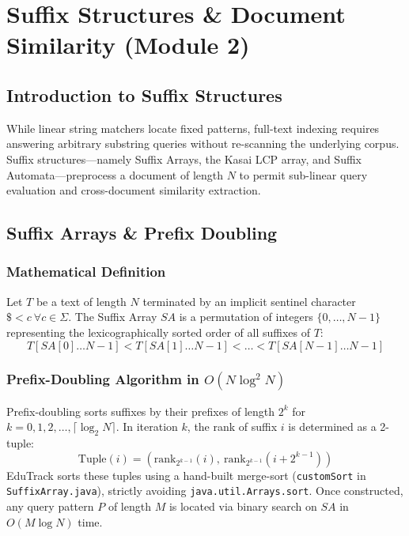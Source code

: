 \chapter{Suffix Structures \& Document Similarity (Module 2)}
\label{ch:suffix_structures}

\section{Introduction to Suffix Structures}
While linear string matchers locate fixed patterns, full-text indexing requires answering arbitrary substring queries without re-scanning the underlying corpus. Suffix structures—namely Suffix Arrays, the Kasai LCP array, and Suffix Automata—preprocess a document of length $N$ to permit sub-linear query evaluation and cross-document similarity extraction.

\section{Suffix Arrays \& Prefix Doubling}
\subsection{Mathematical Definition}
Let $T$ be a text of length $N$ terminated by an implicit sentinel character $\$ < c \ \forall c \in \Sigma$. The Suffix Array $SA$ is a permutation of integers $\{0, \dots, N - 1\}$ representing the lexicographically sorted order of all suffixes of $T$:
\begin{equation}
T[SA[0] \dots N-1] < T[SA[1] \dots N-1] < \dots < T[SA[N-1] \dots N-1]
\end{equation}

\subsection{Prefix-Doubling Algorithm in $O(N \log^2 N)$}
Prefix-doubling sorts suffixes by their prefixes of length $2^k$ for $k = 0, 1, 2, \dots, \lceil \log_2 N \rceil$. In iteration $k$, the rank of suffix $i$ is determined as a 2-tuple:
\begin{equation}
\text{Tuple}(i) = \left( \text{rank}_{2^{k-1}}(i), \ \text{rank}_{2^{k-1}}(i + 2^{k-1}) \right)
\end{equation}
EduTrack sorts these tuples using a hand-built merge-sort (\texttt{customSort} in \texttt{SuffixArray.java}), strictly avoiding \texttt{java.util.Arrays.sort}. Once constructed, any query pattern $P$ of length $M$ is located via binary search on $SA$ in $O(M \log N)$ time.

